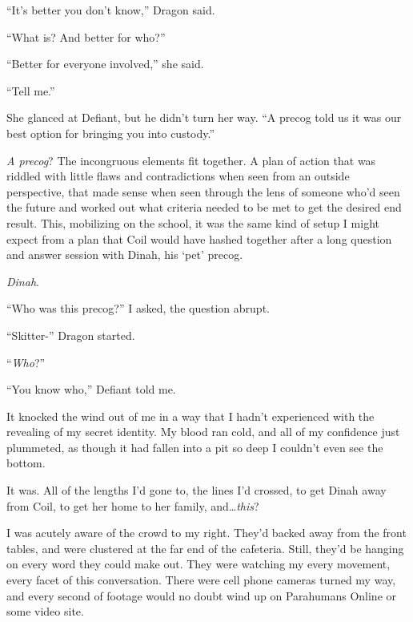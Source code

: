 ``It's better you don't know,'' Dragon said.



``What is?  And better for who?''



``Better for everyone involved,'' she said.



``Tell me.''



She glanced at Defiant, but he didn't turn her way.  ``A precog told us it was our best option for bringing you into custody.''



\emph{A precog}?  The incongruous elements fit together.  A plan of action that was riddled with little flaws and contradictions when seen from an outside perspective, that made sense when seen through the lens of someone who'd seen the future and worked out what criteria needed to be met to get the desired end result.  This, mobilizing on the school, it was the same kind of setup I might expect from a plan that Coil would have hashed together after a long question and answer session with Dinah, his `pet' precog.



\emph{Dinah}.



``Who was this precog?'' I asked, the question abrupt.



``Skitter-''  Dragon started.



``\emph{Who}?''



``You know who,'' Defiant told me.



It knocked the wind out of me in a way that I hadn't experienced with the revealing of my secret identity.  My blood ran cold, and all of my confidence just plummeted, as though it had fallen into a pit so deep I couldn't even see the bottom.



It was.  All of the lengths I'd gone to, the lines I'd crossed, to get Dinah away from Coil, to get her home to her family, and\ldots \emph{this}?



I was acutely aware of the crowd to my right.  They'd backed away from the front tables, and were clustered at the far end of the cafeteria.  Still, they'd be hanging on every word they could make out.  They were watching my every movement, every facet of this conversation.  There were cell phone cameras turned my way, and every second of footage would no doubt wind up on Parahumans Online or some video site.



